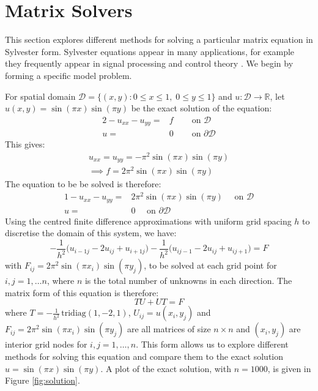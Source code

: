 \documentclass[11pt]{article}
\numberwithin{equation}{section}
\begin{document}
\newpage

\section{Matrix Solvers}
This section explores different methods for solving a particular matrix equation in Sylvester form. Sylvester equations appear in many applications, for example they frequently appear in signal processing \cite{Scottedward} and control theory \cite{Castelan}. We begin by forming a specific model problem. 

For spatial domain $\mathcal{D} = \{(x,y) : 0 \leq x \leq 1, \; 0 \leq y \leq 1 \}$ and $u: \mathcal{D} \rightarrow \mathbb{R}$, let $u(x,y) = \sin{(\pi x)} \sin{(\pi y)}$ be the exact solution of the equation:
\begin{alignat}{2}
-u_{xx} -u_{yy} = {} & f \quad & \text{ on } \mathcal{D} \nonumber \\
u = {} & 0 \quad & \text{ on } \partial \mathcal{D}
\end{alignat}
This gives:
\begin{equation}
\begin{split}
u_{xx} = u_{yy} = - \pi^2 \sin{(\pi x)} \sin{(\pi y)} \\
\implies f = 2 \pi^2 \sin{(\pi x)} \sin {(\pi y)}
\end{split}
\end{equation} 
The equation to be be solved is therefore:
\begin{alignat}{1}
-u_{xx} -u_{yy} = {} & 2 \pi^2 \sin{(\pi x)} \sin {(\pi y)} \quad \text{ on } \mathcal{D} \nonumber \\
u = {} & 0 \quad \text{ on } \partial \mathcal{D}
\end{alignat}
Using the centred finite difference approximations with uniform grid spacing $h$ to discretise the domain of this system, we have:
	\begin{equation}
	-\frac{1}{h^2} \big( u_{i-1j} - 2u_{ij} + u_{i+1j} \big) - \frac{1}{h^2} \big( u_{ij-1} - 2u_{ij} + u_{ij+1} \big) = F
	\end{equation}
with $F_{ij} = 2\pi^2 \sin(\pi x_i) \sin(\pi y_j)$, to be solved at each grid point for $i, j = 1, \dots n$, where $n$ is the total number of unknowns in each direction. The matrix form of this equation is therefore:
\begin{equation}
	TU + UT = F
\end{equation}
where $T=-\frac{1}{h^2} \, \text{tridiag}(1,-2,1)$, $U_{ij} = u(x_i, y_j)$ and $F_{ij} = 2 \pi^2 \sin(\pi x_i) \sin(\pi y_j)$ are all matrices of size $n \times n$ and $(x_i, y_j)$ are interior grid nodes for $i,j=1,\dots,n$. This form allows us to explore different methods for solving this equation and compare them to the exact solution $u = \sin(\pi x) \sin(\pi y)$. A plot of the exact solution, with $n=1000$, is given in Figure \ref{fig:solution}. 
\end{document}
